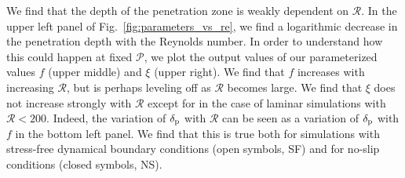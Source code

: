 \documentclass[twocolumn]{aastex631}
\newcommand{\delp}{\ensuremath{\delta_{\rm{p}}}}
\newcommand{\mP}{\ensuremath{\mathcal{P}}}
\newcommand{\mR}{\ensuremath{\mathcal{R}}}
\begin{document}
We find that the depth of the penetration zone is weakly dependent on $\mR$.
In the upper left panel of Fig.~\ref{fig:parameters_vs_re}, we find a logarithmic decrease in the penetration depth with the Reynolds number.
In order to understand how this could happen at fixed $\mP$, we plot the output values of our parameterized values $f$ (upper middle) and $\xi$ (upper right).
We find that $f$ increases with increasing $\mR$, but is perhaps leveling off as $\mR$ becomes large.
We find that $\xi$ does not increase strongly with $\mR$ except for in the case of laminar simulations with $\mR < 200$.
Indeed, the variation of $\delp$ with $\mR$ can be seen as a variation of $\delp$ with $f$ in the bottom left panel.
We find that this is true both for simulations with stress-free dynamical boundary conditions (open symbols, SF) and for no-slip conditions (closed symbols, NS).
\end{document}
